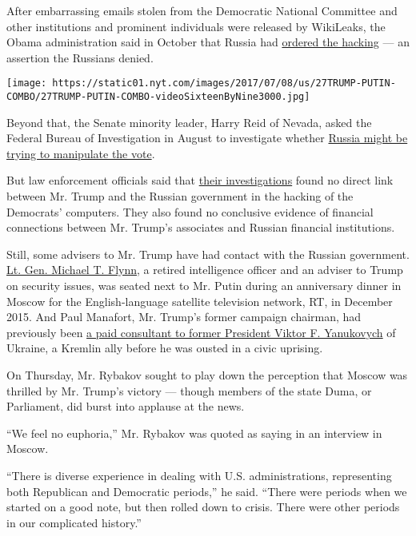 After embarrassing emails stolen from the Democratic National Committee
and other institutions and prominent individuals were released by
WikiLeaks, the Obama administration said in October that Russia had
\href{http://www.nytimes.com/2016/10/08/us/politics/us-formally-accuses-russia-of-stealing-dnc-emails.html}{ordered
the hacking} --- an assertion the Russians denied.

\texttt{[image: https://static01.nyt.com/images/2017/07/08/us/27TRUMP-PUTIN-COMBO/27TRUMP-PUTIN-COMBO-videoSixteenByNine3000.jpg]}

Beyond that, the Senate minority leader, Harry Reid of Nevada, asked the
Federal Bureau of Investigation in August to investigate whether
\href{http://www.nytimes.com/2016/11/01/us/politics/fbi-russia-election-donald-trump.html}{Russia
might be trying to manipulate the vote}.

But law enforcement officials said that
\href{http://www.nytimes.com/2016/11/01/us/politics/fbi-russia-election-donald-trump.html}{their
investigations} found no direct link between Mr. Trump and the Russian
government in the hacking of the Democrats' computers. They also found
no conclusive evidence of financial connections between Mr. Trump's
associates and Russian financial institutions.

Still, some advisers to Mr. Trump have had contact with the Russian
government.
\href{http://www.nytimes.com/2016/10/19/us/politics/michael-flynn-donald-trump.html}{Lt.
Gen. Michael T. Flynn}, a retired intelligence officer and an adviser to
Trump on security issues, was seated next to Mr. Putin during an
anniversary dinner in Moscow for the English-language satellite
television network, RT, in December 2015. And Paul Manafort, Mr. Trump's
former campaign chairman, had previously been
\href{http://www.nytimes.com/2016/08/15/us/politics/paul-manafort-ukraine-donald-trump.html}{a
paid consultant to former President Viktor F. Yanukovych} of Ukraine, a
Kremlin ally before he was ousted in a civic uprising.

On Thursday, Mr. Rybakov sought to play down the perception that Moscow
was thrilled by Mr. Trump's victory --- though members of the state
Duma, or Parliament, did burst into applause at the news.

``We feel no euphoria,'' Mr. Rybakov was quoted as saying in an
interview in Moscow.

``There is diverse experience in dealing with U.S. administrations,
representing both Republican and Democratic periods,'' he said. ``There
were periods when we started on a good note, but then rolled down to
crisis. There were other periods in our complicated history.''

